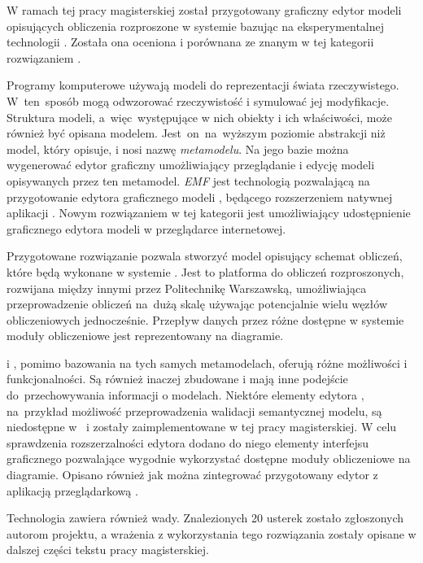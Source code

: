 W ramach tej pracy magisterskiej został przygotowany graficzny edytor modeli
opisujących obliczenia rozproszone w systemie \BalticLSC{} bazując na
eksperymentalnej technologii \SiriusWeb{}. Została ona oceniona i porównana ze
znanym w tej kategorii rozwiązaniem \SiriusDesktop{}.

Programy komputerowe używają modeli do reprezentacji świata rzeczywistego.
W~ten~sposób mogą odwzorować rzeczywistość i symulować jej modyfikacje.
Struktura
modeli, a~więc~występujące w nich obiekty i ich właściwości, może również być
opisana
modelem. Jest~on~na~wyższym poziomie abstrakcji niż model, który opisuje, i
nosi nazwę \emph{metamodelu}.
Na jego bazie można wygenerować edytor graficzny umożliwiający przeglądanie
i edycję modeli opisywanych przez ten metamodel. \emph{\acrlong{EMF}} jest
technologią pozwalającą na przygotowanie edytora graficznego modeli
\SiriusDesktop{},
będącego rozszerzeniem natywnej aplikacji \Eclipse{}. Nowym rozwiązaniem w tej
kategorii jest \SiriusWeb{} umożliwiający udostępnienie graficznego edytora
modeli w przeglądarce internetowej.

Przygotowane rozwiązanie pozwala stworzyć model opisujący schemat obliczeń,
które będą wykonane w systemie \BalticLSC{}. Jest to platforma do obliczeń
rozproszonych, rozwijana między innymi przez Politechnikę Warszawską,
umożliwiająca przeprowadzenie obliczeń na~dużą skalę używając potencjalnie
wielu węzłów obliczeniowych jednocześnie.
Przepływ danych przez różne dostępne w systemie moduły obliczeniowe jest
reprezentowany na diagramie.

\SiriusDesktop{} i \SiriusWeb{}, pomimo bazowania na tych samych metamodelach,
oferują różne możliwości i funkcjonalności. Są również inaczej zbudowane i mają
inne podejście do~przechowywania informacji o modelach. Niektóre elementy
edytora \SiriusDesktop{}, na~przykład możliwość przeprowadzenia walidacji
semantycznej modelu, są niedostępne w~\SiriusWeb{} i zostały zaimplementowane w
tej pracy magisterskiej. W celu sprawdzenia rozszerzalności edytora dodano do
niego elementy interfejsu graficznego pozwalające wygodnie wykorzystać
dostępne moduły obliczeniowe na diagramie. Opisano również jak można
zintegrować przygotowany edytor z aplikacją przeglądarkową \BalticLSC{}.

Technologia \SiriusWeb{} zawiera również wady. Znalezionych 20 usterek zostało
zgłoszonych autorom projektu, a wrażenia z wykorzystania tego rozwiązania
zostały opisane w dalszej części tekstu pracy magisterskiej.
